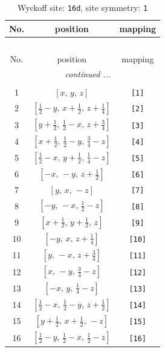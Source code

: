 \documentclass[fleqn,8pt]{jsarticle}
\begin{document}
\begin{longtable}{ccc}
\caption{Wyckoff site: {\tt 16d}, site symmetry: {\tt 1}}
 \\
 \hline \hline
No. & position & mapping \\ \hline \endfirsthead

\multicolumn{2}{l}{\tablename\ \thetable{}} \\
 \hline \hline
No. & position & mapping \\ \hline \endhead

 \hline \hline
\multicolumn{2}{r}{\footnotesize\it continued ...} \\ \endfoot

 \hline \hline
\multicolumn{2}{r}{} \\ \endlastfoot

1 & $\left[ x,\, y,\, z \right]$ & {\tt [1]} \\ \hline
2 & $\left[ \frac{1}{2} - y,\, x + \frac{1}{2},\, z + \frac{1}{4} \right]$ & {\tt [2]} \\ \hline
3 & $\left[ y + \frac{1}{2},\, \frac{1}{2} - x,\, z + \frac{3}{4} \right]$ & {\tt [3]} \\ \hline
4 & $\left[ x + \frac{1}{2},\, \frac{1}{2} - y,\, \frac{3}{4} - z \right]$ & {\tt [4]} \\ \hline
5 & $\left[ \frac{1}{2} - x,\, y + \frac{1}{2},\, \frac{1}{4} - z \right]$ & {\tt [5]} \\ \hline
6 & $\left[ - x,\, - y,\, z + \frac{1}{2} \right]$ & {\tt [6]} \\ \hline
7 & $\left[ y,\, x,\, - z \right]$ & {\tt [7]} \\ \hline
8 & $\left[ - y,\, - x,\, \frac{1}{2} - z \right]$ & {\tt [8]} \\ \hline
9 & $\left[ x + \frac{1}{2},\, y + \frac{1}{2},\, z \right]$ & {\tt [9]} \\ \hline
10 & $\left[ - y,\, x,\, z + \frac{1}{4} \right]$ & {\tt [10]} \\ \hline
11 & $\left[ y,\, - x,\, z + \frac{3}{4} \right]$ & {\tt [11]} \\ \hline
12 & $\left[ x,\, - y,\, \frac{3}{4} - z \right]$ & {\tt [12]} \\ \hline
13 & $\left[ - x,\, y,\, \frac{1}{4} - z \right]$ & {\tt [13]} \\ \hline
14 & $\left[ \frac{1}{2} - x,\, \frac{1}{2} - y,\, z + \frac{1}{2} \right]$ & {\tt [14]} \\ \hline
15 & $\left[ y + \frac{1}{2},\, x + \frac{1}{2},\, - z \right]$ & {\tt [15]} \\ \hline
16 & $\left[ \frac{1}{2} - y,\, \frac{1}{2} - x,\, \frac{1}{2} - z \right]$ & {\tt [16]} \\
\end{longtable}
\end{document}
